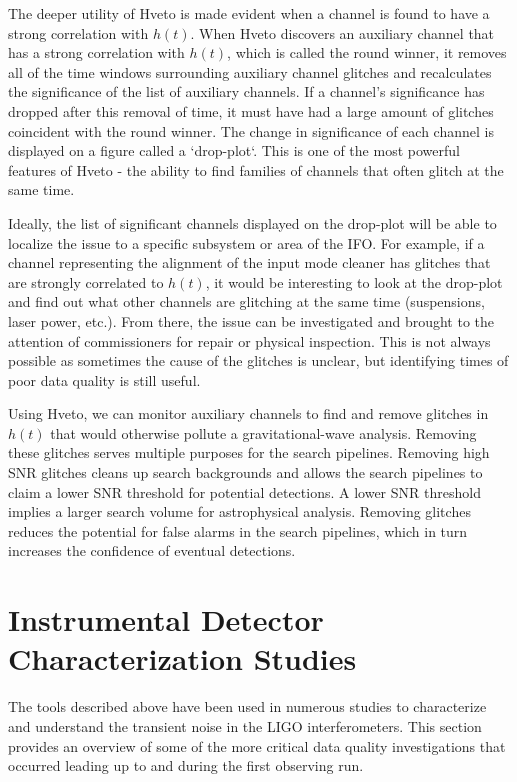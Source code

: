 The deeper utility of Hveto is made evident when a channel is found to have 
a strong correlation with $h(t)$. 
When Hveto discovers an auxiliary channel that has a strong correlation 
with $h(t)$, which is called the round winner, it removes all of the time 
windows surrounding 
auxiliary channel glitches and recalculates the significance of the list of 
auxiliary channels. If a channel's significance has dropped after this removal 
of time, it must have had a large amount of glitches coincident with the 
round winner. The change in significance of each channel is displayed on a 
figure called a `drop-plot`. This is one of the most powerful features of Hveto
 - the ability to find families of channels that often glitch at the same time. 

Ideally, the list of significant channels displayed on the drop-plot will be 
able to localize the issue to a specific subsystem or area of the IFO. 
For example, if a channel representing the alignment of the input mode 
cleaner has glitches that are strongly correlated to $h(t)$, it would be 
interesting to look at the drop-plot and find out what other channels are 
glitching at the same time (suspensions, laser power, etc.).
From there, the issue can be investigated and brought to the attention of 
commissioners for repair or physical inspection. This is not always possible 
as sometimes the cause of the glitches is unclear, but identifying times of 
poor data quality is still useful.

Using Hveto, we can monitor auxiliary channels to find and remove glitches 
in $h(t)$ that would otherwise pollute a gravitational-wave analysis. Removing 
these glitches serves multiple purposes for the search pipelines. Removing 
high SNR glitches cleans up search backgrounds and allows the search 
pipelines to claim a lower SNR threshold for potential detections. A lower 
SNR threshold implies a larger search volume for astrophysical analysis. Removing 
glitches reduces the potential for false alarms in the search pipelines, 
which in turn increases the confidence of eventual detections.

\section{Instrumental Detector Characterization Studies}

The tools described above have been used in numerous studies to characterize 
and understand the transient noise in the LIGO interferometers. This section 
provides an overview of some of the more critical data quality investigations 
that occurred leading up to and during the first observing run.

